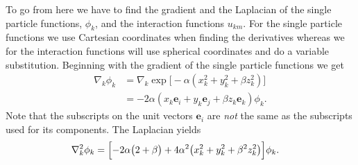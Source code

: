 \documentclass[
    a4paper, aps, twocolumn, floatfix, superscriptaddress]{revtex4-1}
\newcommand{\vf}{\mathbf}
\newcommand{\1}{\mathds{1}}
\begin{document}
            To go from here we have to find the gradient and the Laplacian of
            the single particle functions, $\phi_k$, and the interaction
            functions $u_{km}$. For the single particle functions we use
            Cartesian coordinates when finding the derivatives whereas we for
            the interaction functions will use spherical coordinates and do a
            variable substitution. Beginning with the gradient of the single
            particle functions we get
            \begin{align}
                \nabla_k\phi_k
                &=
                \nabla_k\exp\bigl[
                    -\alpha(x_k^2 + y_k^2 + \beta z_k^2)
                \bigr] \\
                &=
                -2\alpha
                (x_k\vf{e}_i + y_k\vf{e}_j + \beta z_k\vf{e}_k)
                \phi_k.
            \end{align}
            Note that the subscripts on the unit vectors $\vf{e}_i$ are
            \textit{not} the same as the subscripts used for its components. The
            Laplacian yields
            \begin{align}
                \nabla_k^2\phi_k
                &=
                \Bigl[
                    -2\alpha
                    \big(
                        2 + \beta
                    \bigr)
                    + 4\alpha^2
                    \bigl(
                        x_k^2 + y_k^2 + \beta^2z_k^2
                    \bigr)
                \Bigr]
                \phi_k.
            \end{align}
\end{document}
